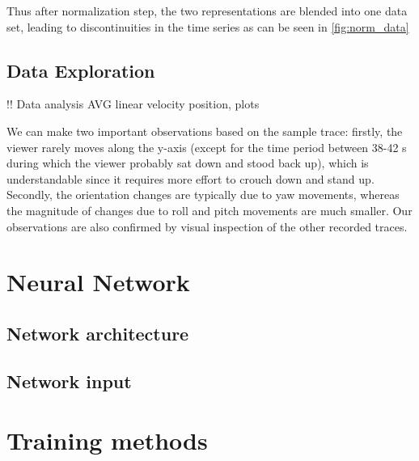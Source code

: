 Thus after normalization step, the two representations are blended into one data set, leading to discontinuities in the time series as can be seen in \ref{fig:norm_data} 



\subsection{Data Exploration}
\label{sec:design:dataset:explor}
!! Data analysis AVG linear velocity position, plots 

We can make two important observations based on the sample trace: firstly, the viewer rarely moves along the y-axis (except for the time period between 38-42 s during which the viewer probably sat down and stood back up), which is understandable since it requires more effort to crouch down and stand up. Secondly, the orientation changes are typically due to yaw movements, whereas the magnitude of changes due to roll and pitch movements are much smaller. Our observations are also confirmed by visual inspection of the other recorded traces.


\section{Neural Network}
\label{sec:design:nn}

\subsection{Network architecture}
\label{sec:design:nn:architecture}

\subsection{Network input}
\label{sec:design:nn:input}


\section{Training methods}
\label{sec:design:train}
